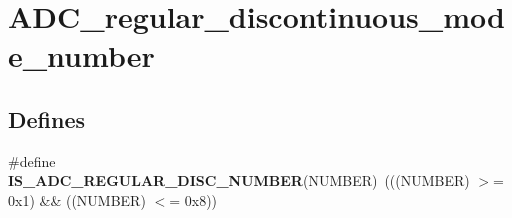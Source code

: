 \hypertarget{group__ADC__regular__discontinuous__mode__number}{
\section{ADC\_\-regular\_\-discontinuous\_\-mode\_\-number}
\label{group__ADC__regular__discontinuous__mode__number}
}
\subsection*{Defines}
\begin{DoxyCompactItemize}
\item 
\hypertarget{group__ADC__regular__discontinuous__mode__number_gab8dfaacb2f25e65ca755de71050ff270}{
\#define {\bfseries IS\_\-ADC\_\-REGULAR\_\-DISC\_\-NUMBER}(NUMBER)~(((NUMBER) $>$= 0x1) \&\& ((NUMBER) $<$= 0x8))}
\label{group__ADC__regular__discontinuous__mode__number_gab8dfaacb2f25e65ca755de71050ff270}

\end{DoxyCompactItemize}
